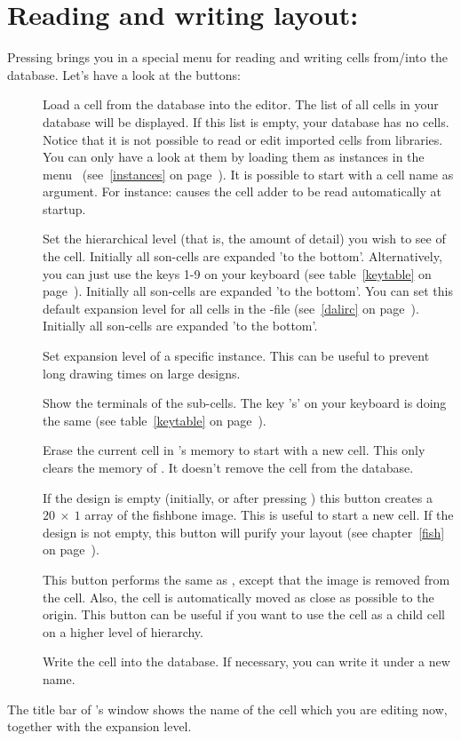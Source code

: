 \section{Reading and writing layout: \protect{}}
Pressing  brings you in a special menu
for reading and writing cells from/into the database. Let's have a look
at the buttons:
\begin{description}
\item []
Load a cell from the database into the editor. The list of all cells
in your database will be displayed. If this list is empty, your
database has no cells. Notice that it is not possible to read or
edit imported cells from libraries. You can only have a look
at them by loading them as instances in the menu~
(see~\ref{instances} on page~\pageref{instances}).
It is possible to start  with a cell name as argument.
For instance:  causes the cell adder
to be read automatically at startup.
\item []
Set the hierarchical level (that is, the amount of detail) you wish to see of
the cell. Initially all son-cells are expanded 'to the bottom'.  Alternatively,
you can just use the keys 1-9 on your keyboard (see table~\ref{keytable} on
page~\pageref{keytable}).  Initially all son-cells are expanded 'to the
bottom'. You can set this default expansion level for all cells in the
-file (see~\ref{dalirc} on page~\pageref{dalirc}).  Initially all
son-cells are expanded 'to the bottom'.
\item []
Set expansion level of a specific instance.
This can be useful to prevent long drawing times on large designs.
\item[]
Show the terminals of the sub-cells. The key 's' on your keyboard is doing the
same (see table~\ref{keytable} on page~\pageref{keytable}).
\item[]
Erase the current cell in 's memory to start with a new cell. 
This only clears the memory of . It doesn't remove the cell
from the database.
\item[]
If the design is empty (initially, or after pressing ) this button
creates a $20~\times~1$ array of the fishbone image.  This is useful to start a
new cell. If the design is not empty, this button will purify your layout (see
chapter~\ref{fish} on page~\pageref{fish}).
\item[]
This button performs the same as , except that the image
is removed from the cell. Also, the cell is automatically moved as close as
possible to the origin. This button can be useful if you want to use the cell
as a child cell on a higher level of hierarchy.
\item[]
Write the cell into the database. If necessary, you can write it under 
a new name.
\end{description}
The title bar of 's window shows the name of the cell
which you are editing now, together with the expansion level.

